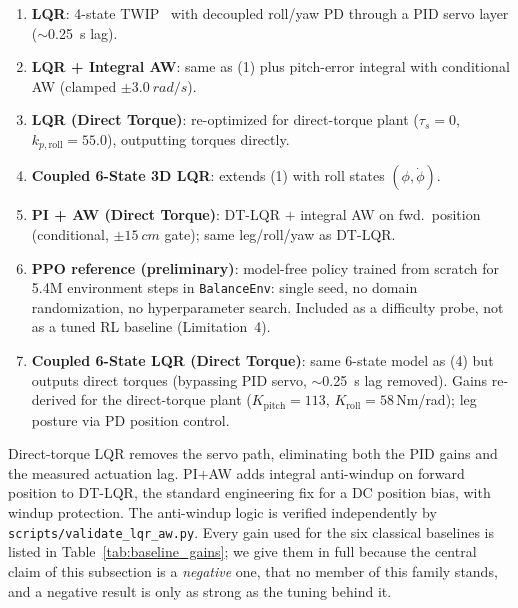 \documentclass[a4paper,fleqn]{cas-dc}
\begin{document}
\begin{enumerate}
\item \textbf{LQR}: 4-state TWIP~\cite{grasser2002joe,pathak2005wip} with decoupled roll/yaw PD through a PID servo layer ($\sim$\SI{0.25}{s} lag).
\item \textbf{LQR + Integral AW}: same as (1) plus pitch-error integral with conditional AW (clamped $\pm\SI{3.0}{rad/s}$).
\item \textbf{LQR (Direct Torque)}: re-optimized for direct-torque plant ($\tau_s{=}0$, $k_{p,\text{roll}}{=}55.0$), outputting torques directly.
\item \textbf{Coupled 6-State 3D LQR}: extends (1) with roll states $(\phi,\dot{\phi})$.
\item \textbf{PI + AW (Direct Torque)}: DT-LQR $+$ integral AW on fwd.\ position (conditional, $\pm\SI{15}{cm}$ gate); same leg/roll/yaw as DT-LQR.
\item \textbf{PPO reference (preliminary)}: model-free policy trained from scratch for \num{5.4}M environment steps in \texttt{BalanceEnv}: single seed, no domain randomization, no hyperparameter search. Included as a difficulty probe, not as a tuned RL baseline (Limitation~4).
\item \textbf{Coupled 6-State LQR (Direct Torque)}: same 6-state model as (4) but outputs direct torques (bypassing PID servo, $\sim$\SI{0.25}{s} lag removed). Gains re-derived for the direct-torque plant ($K_{\text{pitch}}{=}113$, $K_{\text{roll}}{=}58$\,Nm/rad); leg posture via PD position control.
\end{enumerate}

Direct-torque LQR removes the servo path, eliminating both the PID gains and the measured actuation lag. PI+AW adds integral anti-windup on forward position to DT-LQR, the standard engineering fix for a DC position bias, with windup protection. The anti-windup logic is verified independently by \texttt{scripts/validate\_lqr\_aw.py}. Every gain used for the six classical baselines is listed in Table~\ref{tab:baseline_gains}; we give them in full because the central claim of this subsection is a \emph{negative} one, that no member of this family stands, and a negative result is only as strong as the tuning behind it.
\end{document}
